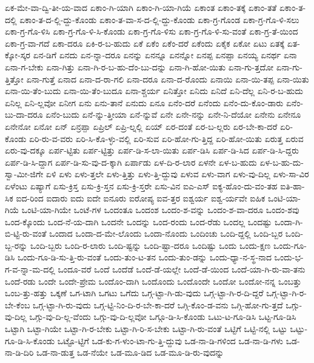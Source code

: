 {ಏಕ-ಮೇ-ವಾ-ದ್ವಿ-ತೀ-ಯ-ವಾದ
ಏಕಾಂ-ಗಿ-ಯಾಗಿ
ಏಕಾಂ-ಗಿ-ಯಾ-ಗಿಯೆ
ಏಕಾಂತ
ಏಕಾಂ-ತಕ್ಕೆ
ಏಕಾಂ-ತತೆ
ಏಕಾಂ-ತ-ದಲ್ಲಿ
ಏಕಾಂ-ತ-ದ-ಲ್ಲಿ-ದ್ದು-ಕೊಂಡು
ಏಕಾಂ-ತ-ವಾ-ಸ-ದ-ಲ್ಲಿ-ದ್ದು-ಕೊಂಡು
ಏಕಾ-ಗ್ರ-ಗೊಂಡ
ಏಕಾ-ಗ್ರ-ಗೊ-ಳಿ-ಸಲು
ಏಕಾ-ಗ್ರ-ಗೊ-ಳಿಸಿ
ಏಕಾ-ಗ್ರ-ಗೊ-ಳಿ-ಸಿ-ಕೊಂಡು
ಏಕಾ-ಗ್ರ-ಗೊ-ಳಿಸು
ಏಕಾ-ಗ್ರ-ಗೊ-ಳಿ-ಸು-ವಂತೆ
ಏಕಾ-ಗ್ರ-ತೆ-ಯಿಂದ
ಏಕಾ-ಗ್ರ-ವಾ-ಗದೆ
ಏಕಾ-ದರೂ
ಏಕಿ-ರ-ಬ-ಹುದು
ಏಕೆ
ಏಕೆಂ
ಏಕೆಂ-ದರೆ
ಏಕೆಂದು
ಏಕೈಕ
ಏಕೋ
ಏಟು
ಏತಕ್ಕೆ
ಏತ-ಕ್ಕೋ-ಸ್ಕರ
ಏನ-ಡಿಗೆ
ಏನದು
ಏನ-ನ್ನಾ-ದರೂ
ಏನನ್ನು
ಏನನ್ನೂ
ಏನನ್ನೋ
ಏನಪ್ಪ
ಏನಪ್ಪಾ
ಏನಯ್ಯ
ಏನರ್ಥ
ಏನಾ
ಏನಾ-ಗ-ಬೇಕು
ಏನಾ-ಗಿತ್ತು
ಏನಾ-ಗಿ-ರ-ಬ-ಹು-ದೆಂ-ಬು-ದನ್ನು
ಏನಾ-ಗಿ-ಹೋ-ಯಿತು
ಏನಾ-ಗು-ತ್ತದೋ
ಏನಾ-ಗು-ತ್ತಿತ್ತೋ
ಏನಾ-ಗುತ್ತೆ
ಏನಾದ
ಏನಾ-ದ-ರಾ-ಗಲಿ
ಏನಾ-ದರೂ
ಏನಾ-ದ-ರೊಂದು
ಏನಾಯಿ
ಏನಾ-ಯಿ-ತಪ್ಪ
ಏನಾ-ಯಿತು
ಏನಾ-ಯಿ-ತೆಂ-ಬುದು
ಏನಾ-ಯಿ-ತೆಂ-ಬುದೂ
ಏನಾ-ಶ್ಚರ್ಯ
ಏನಿತ್ತೋ
ಏನಿದು
ಏನಿದೆ
ಏನಿ-ದೆಲ್ಲ
ಏನಿ-ರ-ಬ-ಹುದು
ಏನಿಲ್ಲ
ಏನಿ-ಲ್ಲವೋ
ಏನೀಗ
ಏನು
ಏನು-ತಾನೆ
ಏನುದು
ಏನೂ
ಏನೆಂ-ದರೆ
ಏನೆಂದು
ಏನೆಂ-ದು-ಕೊಂ-ಡಾರು
ಏನೆಂ-ಬು-ದಾ-ದರೂ
ಏನೆಂ-ಬುದು
ಏನೆ-ನ್ನು-ತ್ತೀಯಾ
ಏನೆ-ನ್ನುವೆ
ಏನೇ
ಏನೇ-ನನ್ನು
ಏನೇ-ನಿ-ದೆಯೋ
ಏನೇನು
ಏನೇನೂ
ಏನೇನೋ
ಏನೋ
ಏನ್
ಏನ್ರಪ್ಪಾ
ಏಪ್ರಿಲ್
ಏಪ್ರಿ-ಲ್ನಲ್ಲಿ
ಏಯ್
ಏರ-ದಂತೆ
ಏರ-ಬ-ಲ್ಲರು
ಏರ-ಬೇ-ಕಾ-ದರೆ
ಏರಿ-ಕೊಂಡು
ಏರಿ-ರು-ವ-ವರು
ಏರಿ-ಸಿ-ಕೊ-ಳ್ಳು-ವಲ್ಲಿ
ಏರಿ-ಸುವ
ಏರಿ-ಹೋ-ಗು-ತ್ತಿದ್ದ
ಏರಿ-ಹೋ-ಯಿತು
ಏರುತ್ತ
ಏರುವ
ಏರು-ವು-ದಕ್ಕೂ
ಏರ್ಪ-ಟ್ಟಿತು
ಏರ್ಪ-ಟ್ಟಿತ್ತು
ಏರ್ಪ-ಡಿ-ಸ-ಲಾ-ಯಿತು
ಏರ್ಪ-ಡಿಸಿ
ಏರ್ಪ-ಡಿ-ಸಿದ
ಏರ್ಪ-ಡಿ-ಸಿ-ದ್ದರು
ಏರ್ಪ-ಡಿ-ಸಿ-ದ್ದಾಗ
ಏರ್ಪ-ಡಿ-ಸು-ವು-ದ-ಕ್ಕಾಗಿ
ಏರ್ಪಾಡು
ಏಳ-ದಿ-ರ-ಲಾರ
ಏಳನೇ
ಏಳ-ಬ-ಹುದು
ಏಳ-ಬ-ಹು-ದು-ಸ್ವಾ-ಮೀ-ಜಿಗೇ
ಏಳಿ
ಏಳು
ಏಳು-ತ್ತಲೇ
ಏಳು-ತ್ತಿತ್ತು
ಏಳು-ತ್ತಿ-ದ್ದುವು
ಏಳುವ
ಏಳು-ವಾಗ
ಏಳು-ವು-ದಿಲ್ಲ
ಏಳು-ಸಾ-ವಿರ
ಏಳೆಂಟು
ಏಷ್ಯಾಗೆ
ಏಸು-ಕ್ರಿಸ್ತ
ಏಸು-ಕ್ರಿ-ಸ್ತನ
ಏಸು-ಕ್ರಿ-ಸ್ತರೇ
ಏಸು-ವಿನ
ಐಎ-ಎಸ್
ಐಕ್ಯ-ಹೊಂ-ದು-ವಂ-ತಹ
ಐತಿ-ಹಾ-ಸಿಕ
ಐದ-ರಿಂದ
ಐದಾರು
ಐದು
ಐದೇ
ಐನೂರು
ಐರೋಪ್ಯ
ಐವ-ತ್ತರ
ಐಶ್ವರ್ಯ
ಐಶ್ವ-ರ್ಯವೇ
ಐಹಿಕ
ಒಂಟಿ-ಯಾ-ಗಿಯೆ
ಒಂಟಿ-ಯಾ-ಗಿಯೇ
ಒಂಟೆ-ಗಳ
ಒಂದಂತೂ
ಒಂದಂಶ
ಒಂದಂ-ಶ-ವನ್ನು
ಒಂದಂ-ಶ-ವಾ-ದರೂ
ಒಂದಂ-ಶವು
ಒಂದ-ಕ್ಕೊಂದು
ಒಂದ-ನೆ-ಯ-ದಾಗಿ
ಒಂದನೇ
ಒಂದನ್ನು
ಒಂದ-ರಂದು
ಒಂದ-ರೆಡು
ಒಂದಲ್ಲ
ಒಂದಷ್ಟು
ಒಂದಾ-ಗಿ-ಬಿ-ಟ್ಟಿ-ರು-ವಂತೆ
ಒಂದಾದ
ಒಂದಾ-ದ-ಮೇ-ಲೊಂದು
ಒಂದಾ-ನೊಂದು
ಒಂದಿಂಚು
ಒಂದಿ-ದ್ದಲ್ಲಿ
ಒಂದಿ-ಬ್ಬರ
ಒಂದಿ-ಬ್ಬ-ರನ್ನು
ಒಂದಿ-ಬ್ಬರು
ಒಂದಿ-ರ-ಲಾರು
ಒಂದಿ-ಷ್ಟನ್ನು
ಒಂದಿ-ಷ್ಟಾ-ದರೂ
ಒಂದಿಷ್ಟು
ಒಂದು
ಒಂದು-ಕ್ಷಣ
ಒಂದು-ಗೂ-ಡಿಸಿ
ಒಂದು-ಗೂ-ಡಿ-ಸು-ತ್ತಿ-ರು-ವಂತೆ
ಒಂದು-ತುಂ-ಟ-ತನ
ಒಂದು-ತುಂ-ಡನ್ನು
ಒಂದು-ಧ್ಯಾ-ನ-ಸ್ಥ-ನಾದ
ಒಂದು-ಭ-ಗ-ವ-ನ್ನಾ-ಮ-ದಲ್ಲಿ
ಒಂದೂ-ವರೆ
ಒಂದೆ
ಒಂದೆಡೆ
ಒಂದೆ-ಡೆ-ಯಲ್ಲೇ
ಒಂದೆ-ಡೆ-ಯಿಂದ
ಒಂದೆ-ಯಾ-ಗಿ-ರು-ವಾ-ತನು
ಒಂದೆ-ರಡು
ಒಂದೇ
ಒಂದೇ-ಪ್ರೇಮ
ಒಂದೊಂ-ದಾಗಿ
ಒಂದೊಂದು
ಒಂದೊಂದೇ
ಒಂದೋ
ಒಂದೋ-ನನ್ನ
ಒಂಬತ್ತು
ಒಂಬ-ತ್ತು-ಹತ್ತು
ಒಕ್ಕಣೆ
ಒಗ-ಟಾಗಿ
ಒಗಟು
ಒಗೆದು
ಒಗ್ಗ-ಟ್ಟಾ-ಗಿ-ಡು-ವುದು
ಒಗ್ಗ-ಟ್ಟಾ-ಗಿ-ರ-ದಿ-ದ್ದರೆ
ಒಗ್ಗ-ಟ್ಟಾ-ಗಿ-ರ-ಬೇ-ಕೆಂಬ
ಒಗ್ಗ-ಟ್ಟಾ-ಗಿ-ರು-ವುದು
ಒಗ್ಗ-ಟ್ಟಿ-ನಿಂ-ದಿ-ರ-ಬೇ-ಕಾ-ದರೆ
ಒಗ್ಗಿ-ಕೊಂ-ಡ-ವನು
ಒಗ್ಗಿ-ಹೋ-ಗು-ತ್ತದೆ
ಒಗ್ಗು-ವು-ದಿಲ್ಲ
ಒಗ್ಗು-ವು-ದಿ-ಲ್ಲ-ವೆಂದು
ಒಗ್ಗು-ವು-ದಿ-ಲ್ಲವೋ
ಒಗ್ಗೂ-ಡಿ-ಸಿ-ಕೊಂಡು
ಒಟು-ಟ-ಗೂ-ಡಿಸಿ
ಒಟ್ಟ-ಗೂ-ಡಿಸಿ
ಒಟ್ಟಾಗಿ
ಒಟ್ಟಾ-ಗಿಯೇ
ಒಟ್ಟಾ-ಗಿ-ರ-ಬೇಕು
ಒಟ್ಟಾ-ಗಿ-ರಿ-ಸ-ಬೇಕು
ಒಟ್ಟಾ-ಗಿ-ರು-ವಂತೆ
ಒಟ್ಟಿಗೆ
ಒಟ್ಟಿ-ನಲ್ಲಿ
ಒಟ್ಟು
ಒಟ್ಟು-ಗೂ-ಡಿ-ಸಿ-ಕೊಂಡು
ಒಟ್ಟೊ-ಟ್ಟಿಗೆ
ಒಡ-ಕು-ಗ-ಳುಂ-ಟಾ-ಗು-ತ್ತಿ-ದ್ದುವು
ಒಡ-ನಾ-ಡಿ-ಗಳಿಂದ
ಒಡ-ನಾ-ಡಿ-ಗಳು
ಒಡ-ನಾ-ಡಿ-ದಿರಿ
ಒಡ-ನಾ-ಡುತ್ತ
ಒಡ-ನೆಯೇ
ಒಡ-ಮೂ-ಡಿದ
ಒಡ-ಮೂ-ಡಿ-ರು-ವುದನ್ನು
}
